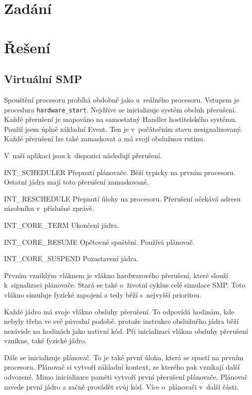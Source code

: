 \documentclass[a4paper,12pt]{article}
\begin{document}
\section{Zadání}

\section{Řešení}

\subsection{Virtuální SMP}
Spouštění procesoru probíhá obdobně jako u~reálného procesoru. Vstupem je procedura
\verb+hardware_start+. Nejdříve se inicializuje
systém obsluh přerušení. Každé přerušení je mapováno na samostatný Handler
hostitelského systému. Použil jsem úplně základní Event. Ten je v~počátečním stavu
nesignalizovaný. Každé přerušení lze také zamaskovat a má svojí obslužnou rutinu.

V~naší aplikaci jsou k~dispozici následují přerušení.

\begin{description}
\item{INT\_SCHEDULER} Přepnutí plánovače. Běží typicky na prvním procesoru. Ostatní
jádra mají toto přerušení zamaskované.
\item{INT\_RESCHEDULE} Přepnutí úlohy na procesoru. Přerušení očekává adresu
zásobníku v~příslušné zprávě.
\item{INT\_CORE\_TERM} Ukončení jádra.
\item{INT\_CORE\_RESUME} Opětovné spuštění. Používá plánovač.
\item{INT\_CORE\_SUSPEND} Pozastavení jádra.
\end{description}

Prvním vzniklým vláknem je vlákno hardwarového přerušení, které slouží k~signalizaci
plánovače. Stará se také o~životní cyklus celé simulace SMP. Toto vlákno simuluje
fyzické zapojení a tedy běží s~nejvyšší prioritou.

Každé jádro má svoje vlákno obsluhy přerušení. To odpovídá hodinám, kde nebyly třeba
ve své původní podobě, protože instrukce obslužného jádra běží nezávisle na hodinách
jako nativní kód. Při inicializaci vlákna obsluhy přerušení vznikne, také fyzické jádro.

Dále se inicializuje plánovač. To je také první úloha, která se spustí na prvním procesoru.
Plánovač si vytvoří základní kontext, ze kterého pak vznikají další odvozené. Mimo inicializace
paměti vytvoří první přerušení plánovače. Plánovač zavede první jádro a začně provádět
svůj kód. Více o~plánovači v~další části.
\end{document}
